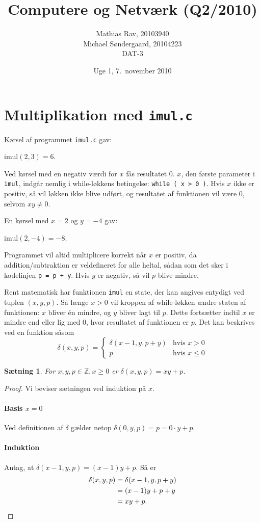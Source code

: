 \documentclass[12pt,a4paper]{article}
\title{Computere og Netværk (Q2/2010)}
\author{Mathias Rav, 20103940 \\
		Michael Søndergaard, 20104223 \\
		DAT-3}
\date{Uge 1, 7.\ november 2010}
\newcommand{\imul}{\texttt{imul}}
\newtheorem{theorem}{Sætning}
\begin{document}
\maketitle

\section{Multiplikation med \texttt{imul.c}}
Kørsel af programmet \texttt{imul.c} gav:

$\text{imul}(2,3) = 6$.

Ved kørsel med en negativ værdi for $x$ fås resultatet $0$.  $x$, den første
parameter i \imul, indgår nemlig i while-løkkens betingelse: \texttt{while ( x
> 0 )}. Hvis $x$ ikke er positiv, så vil løkken ikke blive udført, og
resultatet af funktionen vil være $0$, selvom $xy\ne0$.

En kørsel med $x=2$ og $y=-4$ gav:

$\text{imul}(2,-4) = -8$.

Programmet vil altid multiplicere korrekt når $x$ er positiv, da
addition/subtraktion er veldefineret for alle heltal, sådan som det sker i
kodelinjen \texttt{p = p + y}.  Hvis $y$ er negativ, så vil $p$ blive mindre.

Rent matematisk har funktionen \imul{} en state, der kan angives entydigt ved
tuplen $(x,y,p)$. Så længe $x>0$ vil kroppen af while-løkken ændre staten af
funktionen: $x$ bliver \'en mindre, og $y$ bliver lagt til $p$. Dette
fortsætter indtil $x$ er mindre end eller lig med $0$, hvor resultatet af
funktionen er $p$. Det kan beskrives ved en funktion såsom
\[\delta(x,y,p)=\left\{\begin{array}{cc}
	\delta(x-1,y,p+y) & \text{hvis }x>0 \\
	p & \text{hvis }x\leq 0
\end{array}\right.\]

\begin{theorem}
	For $x,y,p\in\mathbb{Z},x\geq0$ er $\delta(x,y,p)=xy+p$.
\end{theorem}

\begin{proof}
	Vi beviser sætningen ved induktion på $x$.
	\paragraph{Basis $x=0$} Ved definitionen af $\delta$ gælder netop $\delta(0,y,p)=p=0\cdot y+p$.
	\paragraph{Induktion} Antag, at $\delta(x-1,y,p)=(x-1)y+p$. Så er
	\begin{align*}
		\delta(x,y,p)&=\delta(x-1,y,p+y) \\
		&=(x-1)y+p+y \\
		&=xy+p. \qedhere{}
	\end{align*}
\end{proof}
\end{document}
